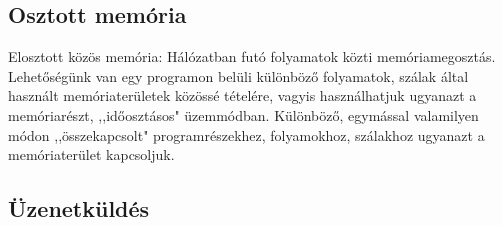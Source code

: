 \documentclass[margin=0px]{article}
\begin{document}
\subsection{Osztott memória}

Elosztott közös memória: Hálózatban futó folyamatok közti memóriamegosztás. \\
Lehetőségünk van egy programon belüli különböző folyamatok, szálak által használt memóriaterületek közössé tételére, vagyis használhatjuk ugyanazt a memóriarészt, ,,időosztásos" üzemmódban. Különböző, egymással valamilyen módon ,,összekapcsolt" programrészekhez, folyamokhoz, szálakhoz ugyanazt a memóriaterület kapcsoljuk.

\subsection{Üzenetküldés}
\end{document}
